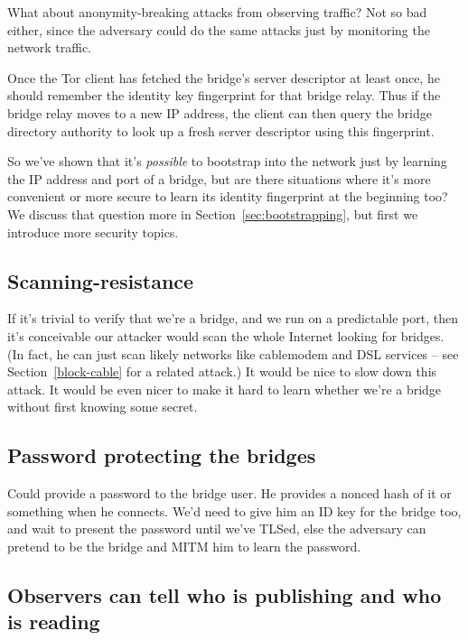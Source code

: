 \documentclass{llncs}
\begin{document}
What about anonymity-breaking attacks from observing traffic? Not so bad
either, since the adversary could do the same attacks just by monitoring
the network traffic.

Once the Tor client has fetched the bridge's server descriptor at least
once, he should remember the identity key fingerprint for that bridge
relay. Thus if the bridge relay moves to a new IP address, the client
can then query the bridge directory authority to look up a fresh server
descriptor using this fingerprint.

So we've shown that it's \emph{possible} to bootstrap into the network
just by learning the IP address and port of a bridge, but are there
situations where it's more convenient or more secure to learn its
identity fingerprint at the beginning too? We discuss that question
more in Section~\ref{sec:bootstrapping}, but first we introduce more
security topics.

\subsection{Scanning-resistance}

If it's trivial to verify that we're a bridge, and we run on a predictable
port, then it's conceivable our attacker would scan the whole Internet
looking for bridges. (In fact, he can just scan likely networks like
cablemodem and DSL services -- see Section~\ref{block-cable} for a related
attack.) It would be nice to slow down this attack. It would
be even nicer to make it hard to learn whether we're a bridge without
first knowing some secret.

\subsection{Password protecting the bridges}

Could provide a password to the bridge user. He provides a nonced hash of
it or something when he connects. We'd need to give him an ID key for the
bridge too, and wait to present the password until we've TLSed, else the
adversary can pretend to be the bridge and MITM him to learn the password.




\subsection{Observers can tell who is publishing and who is reading}
\label{subsec:upload-padding}
\end{document}
